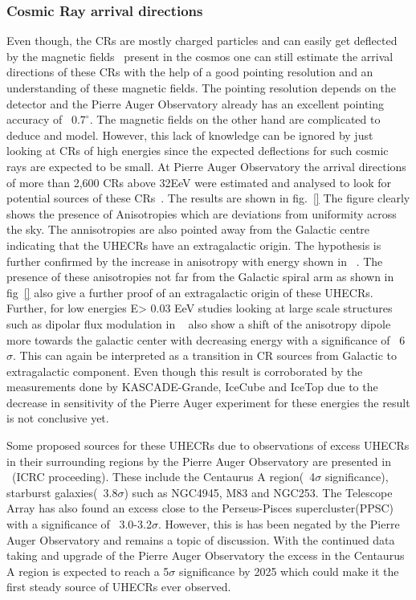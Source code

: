 \subsubsection*{Cosmic Ray arrival directions}
\label{subsubsec:CRdirec}
Even though, the CRs are mostly charged particles and can easily get deflected by the magnetic fields~\cite{} present in the cosmos one can still estimate the arrival directions of these CRs with the help of a good pointing resolution and an understanding of these magnetic fields. The pointing resolution depends on the detector and the Pierre Auger Observatory already has an excellent pointing accuracy of ~$0.7^{\circ}$. The magnetic fields on the other hand are complicated to deduce and model. However, this lack of knowledge can be ignored by just looking at CRs of high energies since the expected deflections for such cosmic rays are expected to be small. At Pierre Auger Observatory the arrival directions of more than 2,600 CRs above 32EeV were estimated and analysed to look for potential sources of these CRs~\cite{}. The results are shown in fig.~\ref{} The figure clearly shows the presence of Anisotropies which are deviations from uniformity across the sky. The annisotropies are also pointed away from the Galactic centre indicating that the UHECRs have an extragalactic origin. The hypothesis is further confirmed by the increase in anisotropy with energy shown in ~\cite{}. The presence of these anisotropies not far from the Galactic spiral arm as shown in fig~\ref{} also give a further proof of an extragalactic origin of these UHECRs. Further, for low energies E> 0.03 EeV studies looking at large scale structures such as dipolar flux modulation in ~\cite{} also show a shift of the anisotropy dipole more towards the galactic center with decreasing energy with a significance of ~6$\sigma$. This can again be interpreted as a transition in CR sources from Galactic to extragalactic component. Even though this result is corroborated by the measurements done by KASCADE-Grande, IceCube and IceTop due to the decrease in sensitivity of the Pierre Auger experiment for these energies the result is not conclusive yet.

Some proposed sources for these UHECRs due to observations of excess UHECRs in their surrounding regions by the Pierre Auger Observatory are presented in ~\cite{}(ICRC proceeding). These include the Centaurus A region(~4$\sigma$ significance), starburst galaxies(~3.8$\sigma$) such as NGC4945, M83 and NGC253. The Telescope Array has also found an excess close to the Perseus-Pisces supercluster(PPSC) with a significance of ~3.0-3.2$\sigma$. However, this is has been negated by the Pierre Auger Observatory and remains a topic of discussion. With the continued data taking and upgrade of the Pierre Auger Observatory the excess in the Centaurus A region is expected to reach a 5$\sigma$ significance by 2025 which could make it the first steady source of UHECRs ever observed. 
 

